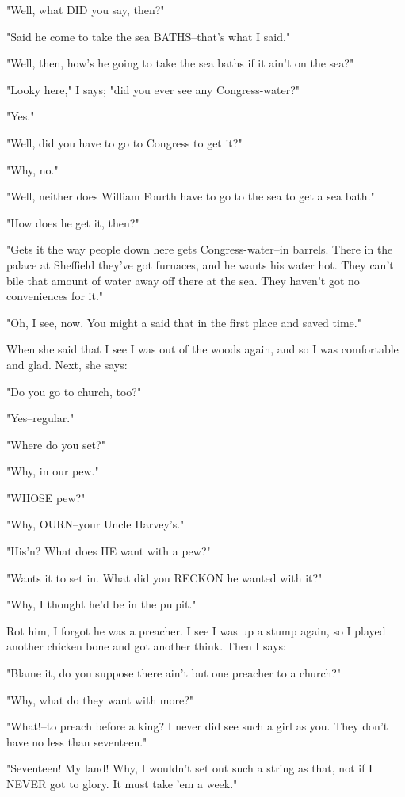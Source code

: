 "Well, what DID you say, then?"

"Said he come to take the sea BATHS--that's what I said."

"Well, then, how's he going to take the sea baths if it ain't on the
sea?"

"Looky here," I says; "did you ever see any Congress-water?"

"Yes."

"Well, did you have to go to Congress to get it?"

"Why, no."

"Well, neither does William Fourth have to go to the sea to get a sea
bath."

"How does he get it, then?"

"Gets it the way people down here gets Congress-water--in barrels.  There
in the palace at Sheffield they've got furnaces, and he wants his water
hot.  They can't bile that amount of water away off there at the sea.
They haven't got no conveniences for it."

"Oh, I see, now.  You might a said that in the first place and saved
time."

When she said that I see I was out of the woods again, and so I was
comfortable and glad.  Next, she says:

"Do you go to church, too?"

"Yes--regular."

"Where do you set?"

"Why, in our pew."

"WHOSE pew?"

"Why, OURN--your Uncle Harvey's."

"His'n?  What does HE want with a pew?"

"Wants it to set in.  What did you RECKON he wanted with it?"

"Why, I thought he'd be in the pulpit."

Rot him, I forgot he was a preacher.  I see I was up a stump again, so I
played another chicken bone and got another think.  Then I says:

"Blame it, do you suppose there ain't but one preacher to a church?"

"Why, what do they want with more?"

"What!--to preach before a king?  I never did see such a girl as you.
They don't have no less than seventeen."

"Seventeen!  My land!  Why, I wouldn't set out such a string as that, not
if I NEVER got to glory.  It must take 'em a week."


